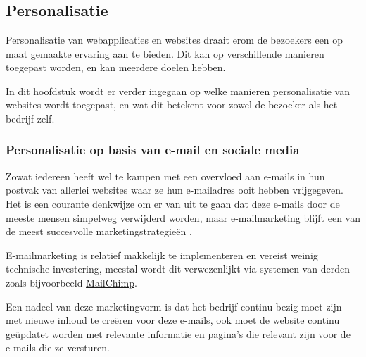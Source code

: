 \chapter{}
\label{ch:stand-van-zaken}



\section{Personalisatie}
\label{sec:Personalisatie}

Personalisatie van webapplicaties en websites draait erom de bezoekers een op maat gemaakte ervaring aan te bieden. Dit kan op verschillende manieren toegepast worden, en kan meerdere doelen hebben. 

In dit hoofdstuk wordt er verder ingegaan op welke manieren personalisatie van websites wordt toegepast, en wat dit betekent voor zowel de bezoeker als het bedrijf zelf.

\subsection{Personalisatie op basis van e-mail en sociale media}
\label{subsec:Personalisatie op basis van e-mail en Social Media}

Zowat iedereen heeft wel te kampen met een overvloed aan e-mails in hun postvak van allerlei websites waar ze hun e-mailadres ooit hebben vrijgegeven. Het is een courante denkwijze om er van uit te gaan dat deze  e-mails door de meeste mensen simpelweg verwijderd worden, maar e-mailmarketing blijft een van de meest succesvolle marketingstrategieën \autocite{Dehkordi2012}. 

E-mailmarketing is relatief makkelijk te implementeren en vereist weinig technische investering, meestal wordt dit verwezenlijkt via systemen van derden zoals bijvoorbeeld \href{https://mailchimp.com/}{MailChimp}. 

Een nadeel van deze marketingvorm is dat het bedrijf continu bezig moet zijn met nieuwe inhoud te creëren voor deze e-mails, ook moet de website continu geüpdatet worden met relevante informatie en pagina's die relevant zijn voor de e-mails die ze versturen.

